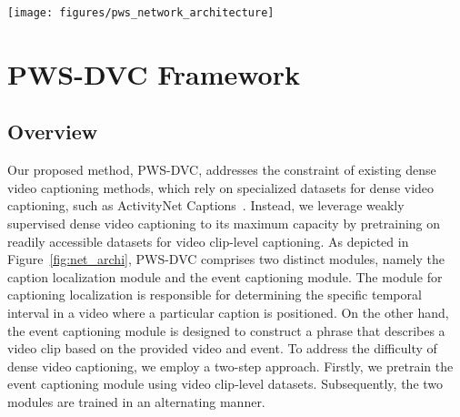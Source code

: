 \begin{sidewaysfigure}
    \centering
    \texttt{[image: figures/pws\_network\_architecture]}
    \caption{Network architecture of the proposed model, PWS-DVC.
        PWS-DVC consists of two modules: caption localization and event captioning.
        The caption localization module takes a video and a caption as input and aims to localize which temporal region the caption corresponds to in the video.
        The event captioning module aims to generate a sentence describing the event given a video and its event.
        Both modules enable dense video captioning by alternatively training with video and ground-truth captions without supervision on events.}
    \label{fig:net_archi}
\end{sidewaysfigure}

\section{PWS-DVC Framework}

\subsection{Overview}
Our proposed method, PWS-DVC, addresses the constraint of existing dense video captioning methods, which rely on specialized datasets for dense video captioning, such as ActivityNet Captions~\cite{Krishna2017-pw}.
Instead, we leverage weakly supervised dense video captioning to its maximum capacity by pretraining on readily accessible datasets for video clip-level captioning.
As depicted in Figure~\ref{fig:net_archi}, PWS-DVC comprises two distinct modules, namely the caption localization module and the event captioning module.
The module for captioning localization is responsible for determining the specific temporal interval in a video where a particular caption is positioned. On the other hand, the event captioning module is designed to construct a phrase that describes a video clip based on the provided video and event.
To address the difficulty of dense video captioning, we employ a two-step approach. Firstly, we pretrain the event captioning module using video clip-level datasets.
Subsequently, the two modules are trained in an alternating manner.

